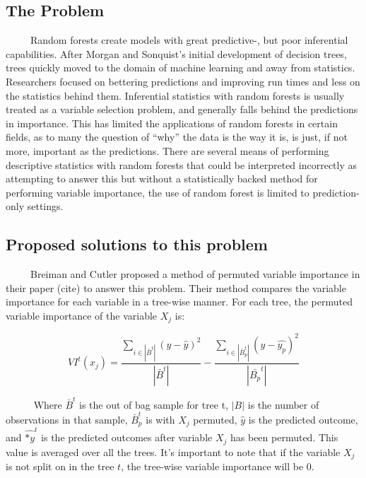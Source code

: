 \documentclass[12pt,twoside]{reedthesis}
\begin{document}
  \subsection{The Problem}\label{the-problem}
  
  ~~~~~Random forests create models with great predictive-, but poor
  inferential capabilities. After Morgan and Sonquist's initial
  development of decision trees, trees quickly moved to the domain of
  machine learning and away from statistics. Researchers focused on
  bettering predictions and improving run times and less on the statistics
  behind them. Inferential statistics with random forests is usually
  treated as a variable selection problem, and generally falls behind the
  predictions in importance. This has limited the applications of random
  forests in certain fields, as to many the question of ``why'' the data
  is the way it is, is just, if not more, important as the predictions.
  There are several means of performing descriptive statistics with random
  forests that could be interpreted incorrectly as attempting to answer
  this but without a statistically backed method for performing variable
  importance, the use of random forest is limited to prediction-only
  settings.
  
  \subsection{Proposed solutions to this
  problem}\label{proposed-solutions-to-this-problem}
  
  ~~~~~Breiman and Cutler proposed a method of permuted variable
  importance in their paper (cite) to answer this problem. Their method
  compares the variable importance for each variable in a tree-wise
  manner. For each tree, the permuted variable importance of the variable
  \(X_j\) is:
  
  \[VI^t(x_j) = \frac{\sum_{i \in |\bar{B}^t|} ({y} - \hat{y})^2}{|\bar{B}^t|} - \frac{\sum_{i \in |\bar{B}^t_p|} ({y} - \hat{y_p})^2}{|\bar{B_p}^t|} \]
  
  ~~~~~ Where \(\bar{B}^t\) is the out of bag sample for tree t, \(|B|\)
  is the number of observations in that sample, \(\bar{B}_p^t\) is with
  \(X_j\) permuted, \(\hat{y}\) is the predicted outcome, and
  \(\hat{*y}^t\) is the predicted outcomes after variable \(X_j\) has been
  permuted. This value is averaged over all the trees. It's important to
  note that if the variable \(X_j\) is not split on in the tree \(t\), the
  tree-wise variable importance will be 0.
  
\end{document}
